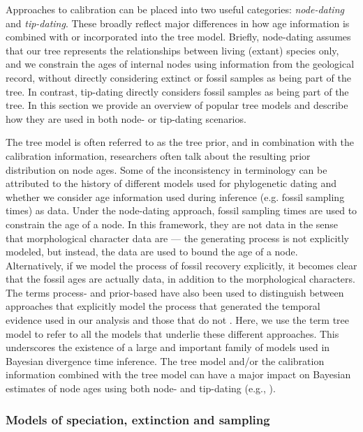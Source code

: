 Approaches to calibration can be placed into two useful categories: \textit{node-dating} and \textit{tip-dating}. 
These broadly reflect major differences in how age information is combined with or incorporated into the tree model.
Briefly, node-dating assumes that our tree represents the relationships between living (extant) species only, and we constrain the ages of internal nodes using information from the geological record, without directly considering extinct or fossil samples as being part of the tree.
In contrast, tip-dating directly considers fossil samples as being part of the tree.
In this section we provide an overview of popular tree models and describe how they are used in both node- or tip-dating scenarios.

The tree model is often referred to as the tree prior, and in combination with the calibration information, researchers often talk about the resulting prior distribution on node ages.
Some of the inconsistency in terminology can be attributed to the history of different models used for phylogenetic dating and whether we consider age information used during inference (e.g. fossil sampling times) as data.
Under the node-dating approach, fossil sampling times are used to constrain the age of a node.
In this framework, they are not data in the sense that morphological character data are --- the generating process is not explicitly modeled, but instead, the data are used to bound the age of a node.
Alternatively, if we model the process of fossil recovery explicitly, it becomes clear that the fossil ages are actually data, in addition to the morphological characters.
The terms process- and prior-based have also been used to distinguish between approaches that explicitly model the  process that generated the temporal evidence used in our analysis and those that do not \citep{Landis2016}. 
Here, we use the term tree model to refer to all the models that underlie these different approaches.
This underscores the existence of a large and important family of models used in Bayesian divergence time inference.
The tree model and/or the calibration information combined with the tree model can have a major impact on Bayesian estimates of node ages using both node- and tip-dating (e.g., \citep{Ho2009,Warnock2011,OReilly2015,matzke2016,Matschiner2017}).

\subsubsection{Models of speciation, extinction and sampling}

